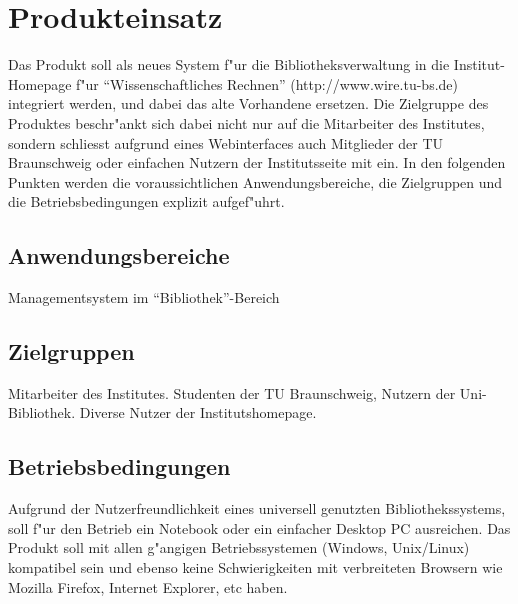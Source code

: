 \chapter{Produkteinsatz}
Das Produkt soll als neues System f"ur die Bibliotheksverwaltung in die Institut-Homepage f"ur "`Wissenschaftliches Rechnen"' (http://www.wire.tu-bs.de) integriert werden, und dabei das alte Vorhandene ersetzen. Die Zielgruppe des Produktes beschr"ankt sich dabei nicht nur auf die Mitarbeiter des Institutes, sondern schliesst aufgrund eines Webinterfaces auch Mitglieder der TU Braunschweig oder einfachen Nutzern der Institutsseite mit ein. 
In den folgenden Punkten werden die voraussichtlichen Anwendungsbereiche, die Zielgruppen und die Betriebsbedingungen explizit aufgef"uhrt. 

\section{Anwendungsbereiche}
Managementsystem im "`Bibliothek"'-Bereich

\section{Zielgruppen}
Mitarbeiter des Institutes. 
Studenten der TU Braunschweig, Nutzern der Uni-Bibliothek.
Diverse Nutzer der Institutshomepage. 

\section{Betriebsbedingungen}
Aufgrund der Nutzerfreundlichkeit eines universell genutzten Bibliothekssystems, soll 
f"ur den Betrieb ein Notebook oder ein einfacher Desktop PC ausreichen. Das Produkt soll mit allen g"angigen Betriebssystemen (Windows, Unix/Linux) kompatibel sein und ebenso keine Schwierigkeiten mit verbreiteten Browsern wie Mozilla Firefox, Internet Explorer, etc haben.  